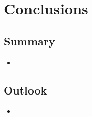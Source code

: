 \chapter{Conclusions}
\label{chapter:Conclusions}
 
\section{Summary}
\label{sec:Summary}
\begin{itemize}
\item
\end{itemize}	
\section{Outlook}
\label{sec:Outlook}
\begin{itemize}
\item
\end{itemize}	

